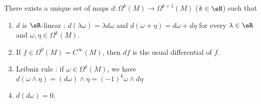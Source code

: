 \begin{proposition}		\label{PROPooTXFRooMtaVrU}
	There exists a unique set of maps \(d \colon \Omega^k(M)\to \Omega^{k+1}(M)  \) (\( k\in \eN\)) such that
	\begin{enumerate}
		\item		\label{ITEMooPQYCooHMjgIR}
		      \( d\) is \( \eR\)-linear :  \( d(\lambda \omega)=\lambda d\omega\) and \( d(\omega+\eta)=d\omega+d\eta\) for every \( \lambda\in \eR\) and \( \omega,\eta\in \Omega^k(M)\).
		\item		\label{ITEMooRKJRooWwHUiS}
		      If \( f\in\Omega^0(M)=C^{\infty}(M)\), then \( df\) is the usual differential of \( f\).
		\item	\label{ITEMooBBFLooWpZJuT}
		      Leibniz rule : if \( \omega\in \Omega^k(M)\), we have \( d(\omega\wedge \eta)=(d\omega)\wedge\eta=(-1)^k\omega\wedge d\eta\)
		\item		\label{ITEMooJXMFooHFTFYi}
		      \( d(d\omega)=0\).
	\end{enumerate}
\end{proposition}

